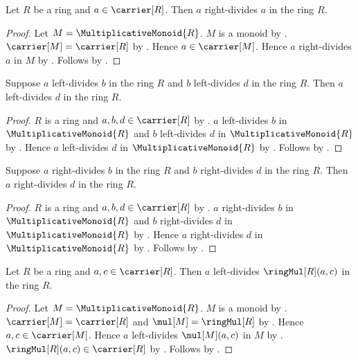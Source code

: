 \begin{proposition}\label{right_ring_divisibility_reflexive}
    Let $R$ be a ring and $a\in\carrier[R]$.
    Then $a$ right-divides $a$ in the ring $R$.
\end{proposition}
\begin{proof}
    Let $M=\MultiplicativeMonoid{R}$.
    $M$ is a monoid by .
    $\carrier[M]=\carrier[R]$ by
        .
    Hence $a\in\carrier[M]$.
    Hence $a$ right-divides $a$ in $M$ by
        .
    Follows by .
\end{proof}

\begin{theorem}\label{left_ring_divisibility_transitive}
    Suppose $a$ left-divides $b$ in the ring $R$ and
        $b$ left-divides $d$ in the ring $R$.
    Then $a$ left-divides $d$ in the ring $R$.
\end{theorem}
\begin{proof}
    $R$ is a ring and $a,b,d\in\carrier[R]$ by
        .
    $a$ left-divides $b$ in $\MultiplicativeMonoid{R}$ and
        $b$ left-divides $d$ in $\MultiplicativeMonoid{R}$ by
        .
    Hence $a$ left-divides $d$ in $\MultiplicativeMonoid{R}$ by
        .
    Follows by .
\end{proof}

\begin{theorem}\label{right_ring_divisibility_transitive}
    Suppose $a$ right-divides $b$ in the ring $R$ and
        $b$ right-divides $d$ in the ring $R$.
    Then $a$ right-divides $d$ in the ring $R$.
\end{theorem}
\begin{proof}
    $R$ is a ring and $a,b,d\in\carrier[R]$ by
        .
    $a$ right-divides $b$ in $\MultiplicativeMonoid{R}$ and
        $b$ right-divides $d$ in $\MultiplicativeMonoid{R}$ by
        .
    Hence $a$ right-divides $d$ in $\MultiplicativeMonoid{R}$ by
        .
    Follows by .
\end{proof}

\begin{proposition}\label{left_ring_divides_product}
    Let $R$ be a ring and $a,c\in\carrier[R]$.
    Then $a$ left-divides $\ringMul[R](a,c)$ in the ring $R$.
\end{proposition}
\begin{proof}
    Let $M=\MultiplicativeMonoid{R}$.
    $M$ is a monoid by .
    $\carrier[M]=\carrier[R]$ and $\mul[M]=\ringMul[R]$ by
        .
    Hence $a,c\in\carrier[M]$.
    Hence $a$ left-divides $\mul[M](a,c)$ in $M$ by
        .
    $\ringMul[R](a,c)\in\carrier[R]$ by .
    Follows by .
\end{proof}

